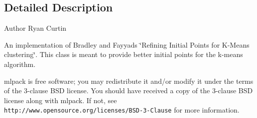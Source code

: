 \subsection{Detailed Description}
\begin{DoxyAuthor}{Author}
Ryan Curtin
\end{DoxyAuthor}
An implementation of Bradley and Fayyad\textquotesingle{}s \char`\"{}\+Refining Initial Points for
\+K-\/\+Means clustering\char`\"{}. This class is meant to provide better initial points for the k-\/means algorithm.

mlpack is free software; you may redistribute it and/or modify it under the terms of the 3-\/clause B\+SD license. You should have received a copy of the 3-\/clause B\+SD license along with mlpack. If not, see {\tt http\+://www.\+opensource.\+org/licenses/\+B\+S\+D-\/3-\/\+Clause} for more information. 